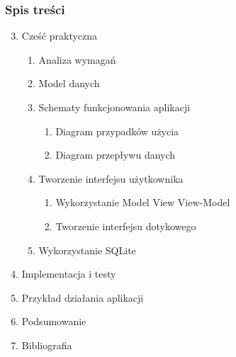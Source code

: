 \begin{frame}
\frametitle{Spis treści}

\begin{enumerate}
\setcounter{enumi}{2}
\item Cześć praktyczna
\begin{enumerate}
\item Analiza wymagań

\item Model danych

\item Schematy funkcjonowania aplikacji
\begin{enumerate}
\item Diagram przypadków użycia
\item Diagram przepływu danych
\end{enumerate}

\item Tworzenie interfejsu użytkownika
\begin{enumerate}
\item Wykorzystanie Model View View-Model
\item Tworzenie interfejsu dotykowego
\end{enumerate}

\item Wykorzystanie SQLite

\end{enumerate}
\item Implementacja i testy
\item Przykład działania aplikacji
\item Podsumowanie
\item Bibliografia

\end{enumerate}


\end{frame}

